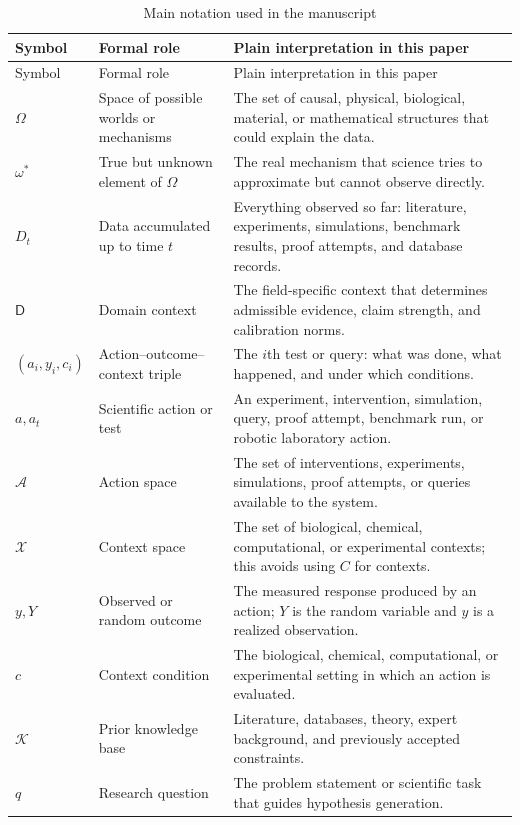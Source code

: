 \documentclass[11pt,a4paper]{article}
\newcommand{\Know}{\mathcal{K}}
\newcommand{\Dom}{\mathsf{D}}
\begin{document}
{\small
\begin{longtable}{@{}p{2.8cm}p{4.1cm}p{6.4cm}@{}}
\caption{Main notation used in the manuscript}
\label{tab:notation}\\
\toprule
Symbol & Formal role & Plain interpretation in this paper \\
\midrule
\endfirsthead
\toprule
Symbol & Formal role & Plain interpretation in this paper \\
\midrule
\endhead
\bottomrule
\endfoot
$\Omega$ & Space of possible worlds or mechanisms & The set of causal, physical, biological, material, or mathematical structures that could explain the data. \\
$\omega^\ast$ & True but unknown element of $\Omega$ & The real mechanism that science tries to approximate but cannot observe directly. \\
$D_t$ & Data accumulated up to time $t$ & Everything observed so far: literature, experiments, simulations, benchmark results, proof attempts, and database records. \\
$\Dom$ & Domain context & The field-specific context that determines admissible evidence, claim strength, and calibration norms. \\
$(a_i,y_i,c_i)$ & Action--outcome--context triple & The $i$th test or query: what was done, what happened, and under which conditions. \\
$a,a_t$ & Scientific action or test & An experiment, intervention, simulation, query, proof attempt, benchmark run, or robotic laboratory action. \\
$\mathcal{A}$ & Action space & The set of interventions, experiments, simulations, proof attempts, or queries available to the system. \\
$\mathcal{X}$ & Context space & The set of biological, chemical, computational, or experimental contexts; this avoids using $C$ for contexts. \\
$y,Y$ & Observed or random outcome & The measured response produced by an action; $Y$ is the random variable and $y$ is a realized observation. \\
$c$ & Context condition & The biological, chemical, computational, or experimental setting in which an action is evaluated. \\
$\Know$ & Prior knowledge base & Literature, databases, theory, expert background, and previously accepted constraints. \\
$q$ & Research question & The problem statement or scientific task that guides hypothesis generation. \\

\end{longtable}}
\end{document}
